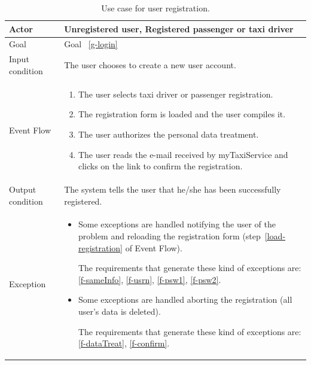 \begin{table}
\begin{center}
\begin{tabular}{| l | p{} |}
\hline
Actor & Unregistered user, Registered passenger or taxi driver \\
\hline
Goal & Goal ~\ref{g-login}
\\
\hline
Input condition & The user chooses to create a new user account.  \\
\hline
Event Flow & \begin{enumerate}
	\item The user selects taxi driver or passenger registration.
	\item The registration form is loaded and the user compiles it.\label{load-registration}
	\item The user authorizes the personal data treatment.
	\item The user reads the e-mail received by myTaxiService and clicks on the link to confirm the registration.
	\end{enumerate}
\\
\hline
Output condition & The system tells the user that he/she has been successfully registered. \\
\hline

Exception &  \begin{itemize}
	\item Some exceptions are handled notifying the user of the problem and reloading the registration form (step~\ref{load-registration} of Event Flow).

	The requirements that generate these kind of exceptions are:
	\ref{f-sameInfo},    %
	\ref{f-usrn},       %
	\ref{f-psw1},     %
	\ref{f-psw2}.    %
	\item Some exceptions are handled aborting the registration (all user's data is deleted).

	The requirements that generate these kind of exceptions are:
	\ref{f-dataTreat},   %
	\ref{f-confirm}.   %
	\end{itemize}
 \\
\hline
\end{tabular}
\end{center}
\caption{Use case for user registration.}
\label{usecase-registration}
\end{table}

